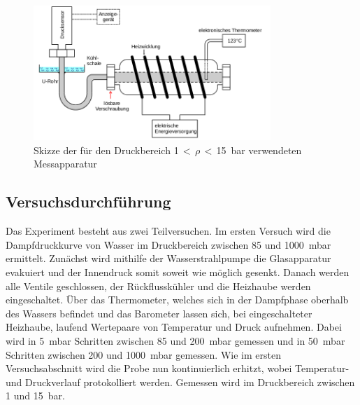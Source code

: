 \documentclass[
  parskip=half,
  bibliography=totoc,     %
  captions=tableheading,  %
  titlepage=firstiscover, %
]{scrartcl}
\begin{document}
\begin{figure}[htb]
  \centering
  \includegraphics[width=0.8\textwidth]{Versuch2.png}
  \caption{Skizze der für den Druckbereich \num{1}\,$<$\,$\rho$\,$<$\,\SI{15}{\bar} verwendeten Messapparatur}
  \label{fig:versuch2}
\end{figure}
\subsection{Versuchsdurchführung}
\label{sec:versuchsdurcführung}
Das Experiment besteht aus zwei Teilversuchen. Im ersten Versuch wird die
Dampfdruckkurve von Wasser im Druckbereich zwischen \num{85} und
\SI{1000}{\milli\bar} ermittelt. Zunächst wird mithilfe der Wasserstrahlpumpe
die Glasapparatur evakuiert und der Innendruck somit soweit wie möglich gesenkt.
Danach werden alle Ventile geschlossen, der Rückflusskühler und die Heizhaube
werden eingeschaltet. Über das Thermometer, welches sich in der Dampfphase
oberhalb des Wassers befindet und das Barometer lassen sich, bei eingeschalteter
Heizhaube, laufend Wertepaare von Temperatur und Druck aufnehmen. Dabei wird in
\SI{5}{\milli\bar} Schritten zwischen \num{85} und \SI{200}{\milli\bar}
gemessen und in \SI{50}{\milli\bar} Schritten zwischen \num{200} und
\SI{1000}{\milli\bar} gemessen.
Wie im ersten Versuchsabschnitt wird die Probe nun kontinuierlich erhitzt, wobei
Temperatur- und Druckverlauf protokolliert werden. Gemessen wird im Druckbereich
zwischen \num{1} und \SI{15}{\bar}.
\end{document}
